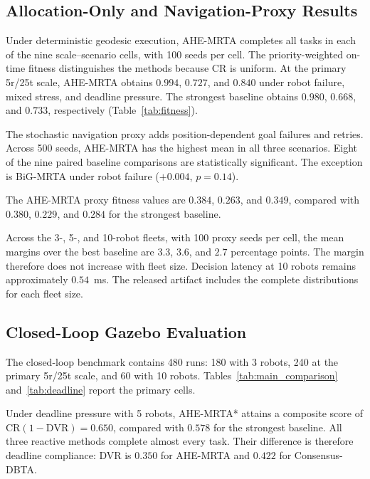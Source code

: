 \documentclass[10pt,letterpaper,onecolumn]{IEEEtran}
\begin{document}
\subsection{Allocation-Only and Navigation-Proxy Results}
\label{sec:results-sim}

Under deterministic geodesic execution, AHE-MRTA completes all tasks in each
of the nine scale--scenario cells, with 100 seeds per cell. The
priority-weighted on-time fitness distinguishes the methods because CR is
uniform. At the primary 5r/25t scale, AHE-MRTA obtains $0.994$, $0.727$, and
$0.840$ under robot failure, mixed stress, and deadline pressure. The strongest
baseline obtains $0.980$, $0.668$, and $0.733$, respectively
(Table~\ref{tab:fitness}).

The stochastic navigation proxy adds position-dependent goal failures and
retries. Across 500 seeds, AHE-MRTA has the highest mean in all three scenarios.
Eight of the nine paired baseline comparisons are statistically significant.
The exception is BiG-MRTA under robot failure ($+0.004$, $p=0.14$).



The AHE-MRTA proxy fitness values are $0.384$, $0.263$, and $0.349$, compared
with $0.380$, $0.229$, and $0.284$ for the strongest baseline.

\label{sec:scalability}

Across the 3-, 5-, and 10-robot fleets, with 100 proxy seeds per cell, the mean
margins over the best baseline are $3.3$, $3.6$, and $2.7$ percentage points.
The margin therefore does not increase with fleet size. Decision latency at 10
robots remains approximately $0.54$~ms. The released artifact includes the
complete distributions for each fleet size.

\subsection{Closed-Loop Gazebo Evaluation}
\label{sec:results-gazebo}

The closed-loop benchmark contains 480 runs: 180 with 3 robots, 240 at the
primary 5r/25t scale, and 60 with 10 robots. Tables~\ref{tab:main_comparison}
and~\ref{tab:deadline} report the primary cells.





Under deadline pressure with 5 robots, AHE-MRTA* attains a composite score of
$\mathrm{CR}(1-\mathrm{DVR})=0.650$, compared with $0.578$ for the strongest
baseline. All three reactive methods complete almost every task. Their
difference is therefore deadline compliance: DVR is $0.350$ for AHE-MRTA and
$0.422$ for Consensus-DBTA.
\end{document}
